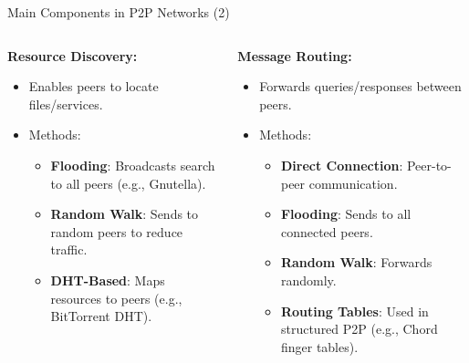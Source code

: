 \documentclass[aspectratio=169, table]{beamer}
\begin{document}
\begin{frame}{Main Components in P2P Networks (2)}
	\vspace{20pt}
	\begin{columns}[t]
		
		\begin{column}{0.5\textwidth}
			\textbf{Resource Discovery:}
			\begin{itemize}
				\item Enables peers to locate files/services.
				\item Methods:
				\begin{itemize}
					\item \textbf{Flooding}: Broadcasts search to all peers (e.g., Gnutella).
					\item \textbf{Random Walk}: Sends to random peers to reduce traffic.
					\item \textbf{DHT-Based}: Maps resources to peers (e.g., BitTorrent DHT).
				\end{itemize}
			\end{itemize}
		\end{column}
		
		\begin{column}{0.5\textwidth}
			\textbf{Message Routing:}
			\begin{itemize}
				\item Forwards queries/responses between peers.
				\item Methods:
				\begin{itemize}
					\item \textbf{Direct Connection}: Peer-to-peer communication.
					\item \textbf{Flooding}: Sends to all connected peers.
					\item \textbf{Random Walk}: Forwards randomly.
					\item \textbf{Routing Tables}: Used in structured P2P (e.g., Chord finger tables).
				\end{itemize}
			\end{itemize}
		\end{column}
		
	\end{columns}
\end{frame}
\end{document}
